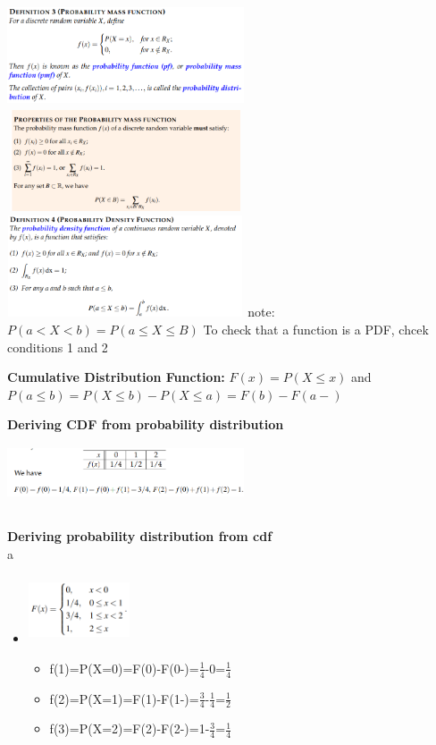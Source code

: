 \documentclass[10pt, landscape]{article}
\begin{document}
\begin{multicols}{4}
\includegraphics[width=7cm, height=3cm]{pmf.png}
\includegraphics[width=7cm, height=3cm]{pmf_properties.png}
\includegraphics[width=7cm, height=3cm]{pdf.png} \newline
note: $P(a<X<b) = P(a\le X \le B)$ \newline
To check that a function is a PDF, chcek conditions 1 and 2 \newline

\textbf{Cumulative Distribution Function:} $F(x)=P(X\le x)$ and $P(a \le b) = P(X \le b) - P(X \le a) = F(b) - F(a-)$ \newline

\textbf{Deriving CDF from probability distribution} \newline
\includegraphics[width=7cm, height=2.3cm]{pf_cdf.png}


\textbf{Deriving probability distribution from cdf} \\a \newline
\begin{multicols*}{2}
  \begin{itemize}
    \item[] \includegraphics[width=3cm, height=2cm]{cdf_pf.png}
    \begin{itemize}
      \item f(1)=P(X=0)=F(0)-F(0-)=$\frac{1}{4}$-0=$\frac{1}{4}$
      \item f(2)=P(X=1)=F(1)-F(1-)=$\frac{3}{4}$-$\frac{1}{4}$=$\frac{1}{2}$
      \item f(3)=P(X=2)=F(2)-F(2-)=1-$\frac{3}{4}$=$\frac{1}{4}$
    \end{itemize}
  \end{itemize}
\end{multicols*}


\end{multicols}
\end{document}
